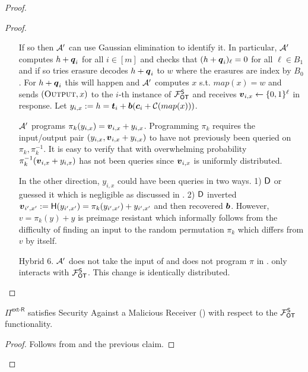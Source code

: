 \begin{proof}
\begin{proof}
\begin{enumerate}[leftmargin=1.8cm]
			
			If so then $\mathcal{A}'$ can use Gaussian elimination to identify it. In particular, $\mathcal{A}'$ computes $h+\boldsymbol{q}_i$ for all $i\in[m]$ and checks that $(h+\boldsymbol{q}_i)_\ell =0$ for all $\ell\in B_1$ and if so tries erasure decodes $h+\boldsymbol{q}_i$ to $w$ where the erasures are index by $B_0$. For $h+\boldsymbol{q}_i$ this will happen and $\mathcal{A}'$ computes $x$ s.t. $map(x)=w$ and sends $(\textsc{Output}, x)$ to the $i$-th instance of $\mathcal{F}_{\mathsf{OT}}^\mathsf{S}$ and receives $\boldsymbol{v}_{i,x}\gets\{0,1\}^\ell$ in response.  Let $y_{i,x}:=h=\boldsymbol{t}_i + \boldsymbol{b} (\boldsymbol{c}_i + \mathcal{C}(map(x)))$.
			
			$\mathcal{A}'$ programs $\pi_k(y_{i,x})=\boldsymbol{v}_{i,x}+y_{i,x}$. Programming $\pi_k$ requires the input/output pair $(y_{i,x},\boldsymbol{v}_{i,x}+y_{i,x})$ to have not previously been queried on $\pi_k,\pi_k^{-1}$.  It is easy to verify that with overwhelming probability $\pi_k^{-1}(\boldsymbol{v}_{i,x}+y_{i,x})$ has not been queries since $\boldsymbol{v}_{i,x}$ is uniformly distributed. 
			
			In the other direction, $y_{i,x}$  could have been queries in two ways. 1) $\mathsf D$ or \Adv guessed it which is negligible as discussed in . 2) $\mathsf D$ inverted $\boldsymbol{v}_{i',x'}:=\mathsf{H}(y_{i',x'})=\pi_k(y_{i',x'})+y_{i',x'}$ and then recovered $\boldsymbol{b}$. However, $v=\pi_k(y)+y$ is preimage resistant\cite{C:BlaRogShr02,SP:Winternitz} which informally follows from the difficulty of finding an input to the random permutation $\pi_k$ which differs from $v$ by itself.
			
			\item[Hybrid 6.] $\mathcal{A}'$ does not take the input of \send and does not program $\pi$ in . \send only interacts with $\mathcal{F}_{\mathsf{OT}}^\mathsf{S}$. This change is identically distributed.
		\end{enumerate} 
		\pe
	\end{proof}


	\begin{claim}\label{claim:ext-R-S-MalReceiver2}
		$\Pi^{\textsf{ext-R}}$ satisfies Security Against a Malicious Receiver () with respect to the $\mathcal{F}_{\mathsf{OT}}^\mathsf{S}$ functionality.
	\end{claim}
	\begin{proof}
		Follows from  and the previous claim.
		\pe
	\end{proof}
	\pe
\end{proof}